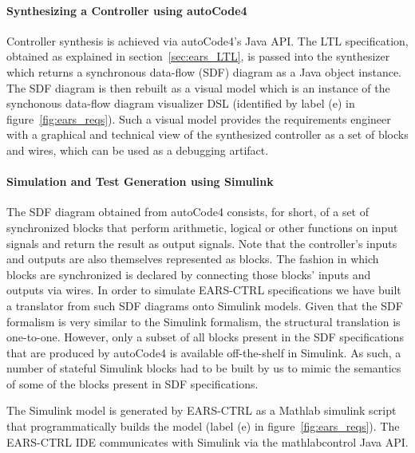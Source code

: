 \paragraph{\textbf{Synthesizing a Controller using \textsf{autoCode4}}\\}
\hspace{-.2cm}Controller synthesis is achieved via \textsf{autoCode4}'s Java
API. The LTL specification, obtained as explained in section~\ref{sec:ears_LTL},
is passed into the synthesizer which returns a synchronous data-flow (SDF) diagram as a Java
object instance. The SDF diagram is then rebuilt as a visual model
which is an instance of the synchonous data-flow diagram visualizer DSL
(identified by label (\textsf{e}) in figure~\ref{fig:ears_reqs}). Such a visual
model provides the requirements engineer with a graphical and technical view of
the synthesized controller as a set of blocks and wires, which can be used as a
debugging artifact.\vspace{-.2cm}
\paragraph{\textbf{Simulation and Test Generation using Simulink}\\}
\hspace{-.2cm}The SDF diagram obtained from \textsf{autoCode4} consists, for
short, of a set of synchronized blocks that perform arithmetic, logical or other functions
on input signals and return the result as output signals. Note that the
controller's inputs and outputs are also themselves represented as blocks. The
fashion in which blocks are synchronized is declared by connecting those blocks'
inputs and outputs via wires. In order to simulate \textsf{EARS-CTRL}
specifications we have built a translator from such SDF diagrams onto Simulink
models. Given that the SDF formalism is very similar to the Simulink formalism,
the structural translation is  one-to-one. However, only a subset of all blocks
present in the SDF specifications that are produced by \textsf{autoCode4} is
available off-the-shelf in Simulink. As such, a number of stateful Simulink
blocks had to be built by us to mimic the semantics of some of the blocks
present in SDF specifications.

The Simulink model is generated by \textsf{EARS-CTRL} as a Mathlab simulink
script that programmatically builds the model (label (\textsf{e}) in
figure~\ref{fig:ears_reqs}). The \textsf{EARS-CTRL} IDE
communicates with Simulink via the \textsf{mathlabcontrol}\cite{mathlabcontrol}
Java API.\vspace{-.5cm}

